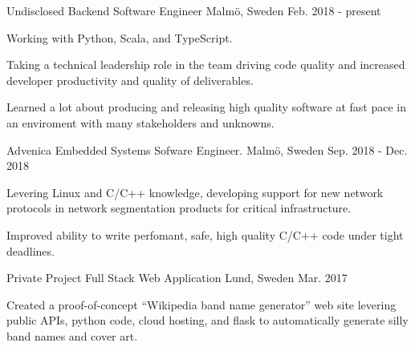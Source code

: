 


\begin{cventries}


\cventry
{Undisclosed} %
{Backend Software Engineer} %
{Malmö, Sweden} %
{Feb. 2018 - present} %
{ %
\begin{cvitems}
\item {Working with Python, Scala, and TypeScript.}
\item {Taking a technical leadership role in the team driving code quality
       and increased developer productivity and quality of deliverables.}
\item {Learned a lot about producing and releasing high quality
       software at fast pace in an enviroment with many stakeholders and
       unknowns.}
\end{cvitems}
}


\cventry
{Advenica} %
{Embedded Systems Sofware Engineer.} %
{Malmö, Sweden} %
{Sep. 2018 - Dec. 2018} %
{ %
\begin{cvitems}
\item {
Levering Linux and C/C++ knowledge, developing support for new network
protocols in network segmentation products for critical infrastructure.}
\item {
Improved ability to write perfomant, safe, high quality C/C++ code under tight
deadlines.}
\end{cvitems}
}

\cventry
{Private Project} %
{Full Stack Web Application } %
{Lund, Sweden} %
{Mar. 2017 } %
{ %
\begin{cvitems}
\item {Created a proof-of-concept ``Wikipedia band name generator'' web site
levering public APIs, python code, cloud hosting, and flask to automatically
generate silly band names and cover art.}
\end{cvitems}
}


\end{cventries}
